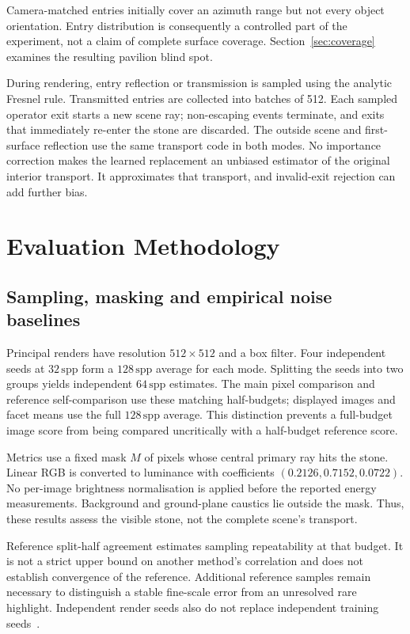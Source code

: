 \documentclass[conference]{IEEEtran}
\newcommand{\spp}{\,\mathrm{spp}}
\begin{document}
Camera-matched entries initially cover an azimuth range but not every object
orientation. Entry distribution is consequently a controlled part of the
experiment, not a claim of complete surface coverage. Section~\ref{sec:coverage}
examines the resulting pavilion blind spot.

During rendering, entry reflection or transmission is sampled using the
analytic Fresnel rule. Transmitted entries are collected into batches of 512.
Each sampled operator exit starts a new scene ray; non-escaping events
terminate, and exits that immediately re-enter the stone are discarded. The
outside scene and first-surface reflection use the same transport code in both
modes. No importance correction makes the learned replacement an unbiased
estimator of the original interior transport. It approximates that transport,
and invalid-exit rejection can add further bias.

\section{Evaluation Methodology}
\label{sec:evaluation}
\subsection{Sampling, masking and empirical noise baselines}
Principal renders have resolution $512\times512$ and a box filter. Four
independent seeds at $32\spp$ form a $128\spp$ average for each mode. Splitting
the seeds into two groups yields independent $64\spp$ estimates. The main
pixel comparison and reference self-comparison use these matching half-budgets;
displayed images and facet means use the full $128\spp$ average. This distinction
prevents a full-budget image score from being compared uncritically with a
half-budget reference score.

Metrics use a fixed mask $M$ of pixels whose central primary ray hits the stone.
Linear RGB is converted to luminance with coefficients $(0.2126,0.7152,0.0722)$.
No per-image brightness normalisation is applied before the reported energy
measurements. Background and ground-plane caustics lie outside the mask. Thus,
these results assess the visible stone, not the complete scene's transport.

Reference split-half agreement estimates sampling repeatability at that budget.
It is not a strict upper bound on another method's correlation and does not
establish convergence of the reference. Additional reference samples remain
necessary to distinguish a stable fine-scale error from an unresolved rare
highlight. Independent render seeds also do not replace independent training
seeds~\cite{pharr2023}.
\end{document}
